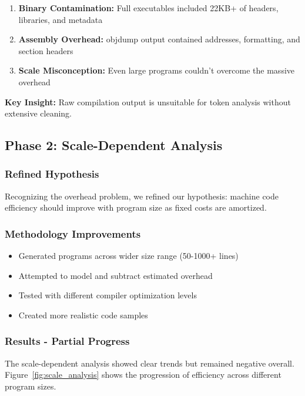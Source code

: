 \documentclass[11pt,a4paper]{article}
\begin{document}
\begin{enumerate}
    \item \textbf{Binary Contamination:} Full executables included 22KB+ of headers, libraries, and metadata
    \item \textbf{Assembly Overhead:} objdump output contained addresses, formatting, and section headers
    \item \textbf{Scale Misconception:} Even large programs couldn't overcome the massive overhead
\end{enumerate}

\textbf{Key Insight:} Raw compilation output is unsuitable for token analysis without extensive cleaning.

\subsection{Phase 2: Scale-Dependent Analysis}
\subsubsection{Refined Hypothesis}
Recognizing the overhead problem, we refined our hypothesis: machine code efficiency should improve with program size as fixed costs are amortized.

\subsubsection{Methodology Improvements}
\begin{itemize}
    \item Generated programs across wider size range (50-1000+ lines)
    \item Attempted to model and subtract estimated overhead
    \item Tested with different compiler optimization levels
    \item Created more realistic code samples
\end{itemize}

\subsubsection{Results - Partial Progress}
The scale-dependent analysis showed clear trends but remained negative overall. Figure~\ref{fig:scale_analysis} shows the progression of efficiency across different program sizes.
\end{document}
